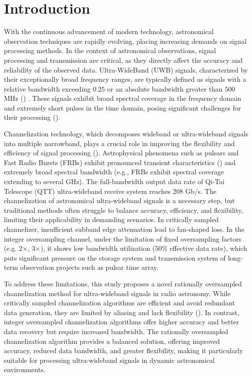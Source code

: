 \documentclass[referee]{raa}
\begin{document}
\section{Introduction}

With the continuous advancement of modern technology, astronomical observation techniques are rapidly evolving, placing increasing demands on signal processing methods. In the context of astronomical observations, signal processing and transmission are critical, as they directly affect the accuracy and reliability of the observed data. Ultra-WideBand (UWB) signals, characterized by their exceptionally broad frequency ranges, are typically defined as signals with a relative bandwidth exceeding $0.25$ or an absolute bandwidth greater than $500$ MHz (\citealt{Sabath+2005}) . These signals exhibit broad spectral coverage in the frequency domain and extremely short pulses in the time domain, posing significant challenges for their processing (\citealt{WuSf+2024}).

Channelization technology, which decomposes wideband or ultra-wideband signals into multiple narrowband, plays a crucial role in improving the flexibility and efficiency of signal processing (\citealt{Tang+2018}). 
Astrophysical phenomena such as pulsars and Fast Radio Bursts (FRBs) exhibit pronounced transient characteristics (\citealt{ZhangHl+2024}) and extremely broad spectral bandwidth (e.g., FRBs exhibit spectral coverage extending to several GHz). The full-bandwidth output data rate of Qi-Tai Telescope (QTT) ultra-wideband receive system reaches 208 Gb/s. The channelization of astronomical ultra-wideband signals is a necessary step, but traditional methods often struggle to balance accuracy, efficiency, and flexibility, limiting their applicability in demanding scenarios. In  critically sampled channelizer, insufficient subband edge attenuation lead to fan-shaped loss. In the integer oversampling channel, under the limitation of fixed oversampling factors (e.g. 2×, 3×), it shows low bandwidth utilization (50\% effective data rate), which puts significant pressure on the storage system and transmission system of long-term observation projects such as pulsar time array.

To address these limitations, this study proposes a novel rationally oversampled channelization method for ultra-wideband signals in radio astronomy. While critically sampled channelization algorithms are efficient and avoid redundant data generation, they are limited by aliasing and lack flexibility (\citealt{Morrison+2020}). In contrast, integer oversampled channelization algorithms offer higher accuracy and better data recovery but require increased bandwidth. The rationally oversampled channelization algorithm provides a balanced solution, offering improved accuracy, reduced data bandwidth, and greater flexibility, making it particularly suitable for processing ultra-wideband signals in dynamic astronomical environments.
\end{document}
